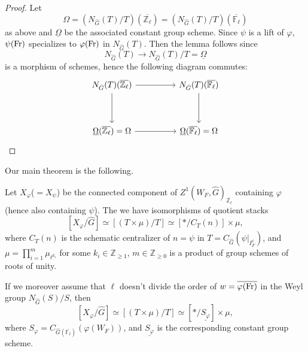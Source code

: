 \begin{proof}
	Let 
	$$\Omega=\left(N_{\hat{G}}(T)/T\right)(\overline{\mathbb{Z}_{\ell}}) = \left(N_{\hat{G}}(T)/T\right)(\overline{\mathbb{F}_{\ell}})$$ 
	as above and $\underline{\Omega}$ be the associated constant group scheme. Since $\psi$ is a lift of $\varphi$, $\psi(\operatorname{Fr})$ specializes to $\varphi(\operatorname{Fr})$ in $N_{\hat{G}}(T)$. Then the lemma follows since 
	$$N_{\hat{G}}(T) \to N_{\hat{G}}(T)/T=\underline{\Omega}$$
	is a morphism of schemes, hence the following diagram commutes:
	$$
	\begin{tikzcd}
		{N_{\hat{G}}(T)(\overline{\mathbb{Z}_\ell})} && {N_{\hat{G}}(T)(\overline{\mathbb{F}_\ell})} \\
		\\
		{\underline{\Omega}(\overline{\mathbb{Z}_\ell})=\Omega} && {\underline{\Omega}(\overline{\mathbb{F}_\ell})=\Omega}
		\arrow[from=1-1, to=1-3]
		\arrow[from=1-1, to=3-1]
		\arrow[from=3-1, to=3-3]
		\arrow[from=1-3, to=3-3]
	\end{tikzcd}
$$
\end{proof}

Our main theorem is the following.

\begin{theorem}\label{Thm X/G}
	Let $X_{\varphi}$($=X_{\psi}$) be the connected component of $Z^1(W_F, \hat{G})_{\overline{\mathbb{Z}_{\ell}}}$ containing $\varphi$ (hence also containing $\psi$). The we have isomorphisms of quotient stacks
	$$[X_{\varphi}/\hat{G}] \simeq [(T \times \mu)/T] \simeq [*/{C_T(n)}] \times \mu,$$
	where $C_T(n)$ is the schematic centralizer of $n=\psi$ in $T=C_{\hat{G}}(\psi|_{I_F^{\ell}})$, and $\mu=\prod_{i=1}^m\mu_{\ell^{k_i}}$ for some $k_i \in \mathbb{Z}_{\geq 1}$, $m \in \mathbb{Z}_{\geq 0}$ is a product of group schemes of roots of unity. 
	
	If we moreover assume that
    $\ell$ doesn't divide the order of $w=\overline{\varphi(\operatorname{Fr})}$ in the Weyl group $N_{\hat{G}}(S)/S$,
	then 
	$$[X_{\varphi}/\hat{G}] \simeq [(T \times \mu)/T] \simeq [*/\underline{S_{\varphi}}] \times \mu,$$
	where $S_{\varphi}=C_{\hat{G}(\overline{\mathbb{F}_{\ell}})}(\varphi(W_F))$, and $\underline{S_{\varphi}}$ is the corresponding constant group scheme.
\end{theorem}

